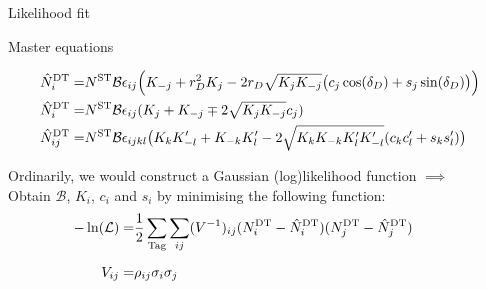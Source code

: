 \documentclass{beamer}
\begin{document}
\begin{frame}{Likelihood fit}
  \begin{block}{Master equations}
    \begin{center}
      \vspace{-0.5cm}
      \begin{align*}
        \hat{N}^{\rm DT}_i =& N^{\rm ST}\mathcal{B}\epsilon_{ij}\Big(K_{-j} + r_D^2K_j - 2r_D\sqrt{K_jK_{-j}}\big(c_j\cos(\delta_D) + s_j\sin(\delta_D)\big)\Big) \\
        \hat{N}^{\rm DT}_i =& N^{\rm ST}\mathcal{B}\epsilon_{ij}(K_j + K_{-j} \mp 2\sqrt{K_jK_{-j}}c_j) \\
        \hat{N}^{\rm DT}_{ij} =& N^{\rm ST}\mathcal{B}\epsilon_{ijkl}\big(K_{k}K_{-l}^\prime + K_{-k}K_{l}^\prime - 2\sqrt{K_{k}K_{-k}K_{l}^\prime K_{-l}^\prime}(c_{k}c_{l}^\prime + s_{k}s_{l}^\prime)\big)
      \end{align*}
    \end{center}
  \end{block}
  \vspace{0.5cm}
  \begin{center}
    Ordinarily, we would construct a Gaussian (log)likelihood function $\implies$\\
    Obtain $\mathcal{B}$, $K_i$, $c_i$ and $s_i$ by minimising the following function:
    \begin{align*}
      -\ln(\mathcal{L}) =& \frac{1}{2}\sum_{\rm Tag}\sum_{ij}(V^{-1})_{ij}(N^{\rm DT}_i - \hat{N}^{\rm DT}_i)(N^{\rm DT}_j - \hat{N}^{\rm DT}_j) \\
      V_{ij} =& \rho_{ij}\sigma_i\sigma_j\phantom{, \quad \sigma_i = \sqrt{\sigma_-\sigma_+ - (\sigma_+ - \sigma_-)(N^{\rm DT}_i - \hat{N}^{\rm DT})}}
    \end{align*}
  \end{center}
\end{frame}
\end{document}
